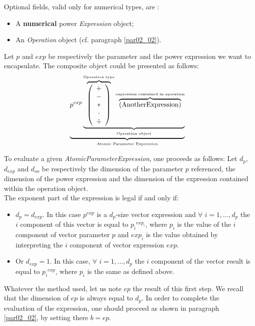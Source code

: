 \documentclass[a4paper,11pt] {ivoa}
\begin{document}
Optional fields, valid only for numerical types, are :
\begin{itemize}
\item A  {\bf numerical} power {\it Expression} object;
\item An  {\it Operation} object (cf. paragraph \ref{par02_02}).\\
\end{itemize}
Let $p$ and $exp$ be respectively the parameter and the power expression we want to encapsulate. The
composite object could be presented as follows:
\begin{equation}\label{eq01}
 \underbrace{  p^{exp} \underbrace{  \overbrace{\left( \begin{array}{c} + \\ - \\ \ast  \\ \cdot \\ \div   \end{array} \right) }^{\mbox{\tiny Operation type}}
 \overbrace{    \left( \mbox{AnotherExpression}\right) }^{\mbox{\tiny expression contained in operation}}   }_{\mbox{\tiny Operation object}}}_{\mbox{\tiny Atomic Parameter Expression}}
\end{equation}

To evaluate a given {\it AtomicParameterExpression}, one proceeds as follows: 
Let $d_p$, $d_{exp}$ and $d_{oo}$ be respectively the dimension of the parameter $p$ referenced, the
dimension of the power expression and the dimension of the expression contained within the operation
object.\\
The exponent part of the expression is legal if and only if:
\begin{itemize}
\item $d_p=d_{exp}$. In this case $p^{exp}$ is a $d_p$-size vector expression and $\forall$
$i=1,...,d_p$ the $i$ component of this vector is equal to ${p_i}^{exp_i}$, where $p_i$ is the value
of the $i$ component of vector parameter $p$ and $exp_i$ is the value obtained by interpreting the
$i$ component of vector expression $exp$.
\item Or $d_{exp}=1$. In this case, $\forall$ $i=1,...,d_p$ the $i$ component of the vector result
is equal to ${p_i}^{exp}$, where $p_i$ is the same as defined above.\\
\end{itemize} 

Whatever the method used, let us note $ep$ the result of this first step. We recall that the
dimension of $ep$ is always equal to $d_p$. In order to complete the evaluation of the expression,
one should proceed as shown in paragraph \ref{par02_02}, by setting there $b=ep$.
\end{document}
